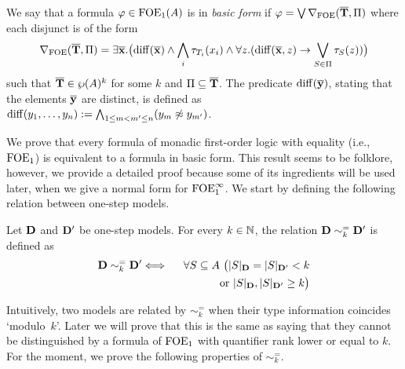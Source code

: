 \begin{definition}%
We say that a formula $\varphi \in \mathrm{FOE}_1(A)$ is in \emph{basic form} if $\varphi = \bigvee \nabla_{\mathrm{FOE}}(\overline{{\mathbf{T}}},\Pi)$ where each disjunct is of the form
%
\[
\nabla_{\mathrm{FOE}}(\overline{{\mathbf{T}}},\Pi) = \exists \overline{{\mathbf{x}}}.\big(\mathrm{diff}(\overline{{\mathbf{x}}}) \land \bigwedge_i \tau_{T_i}(x_i) \land \forall z.(\mathrm{diff}(\overline{{\mathbf{x}}},z) \to \bigvee_{S\in \Pi} \tau_S(z))\big)
\]
%
such that $\overline{{\mathbf{T}}} \in \wp(A)^k$ for some $k$ and $\Pi \subseteq \overline{{\mathbf{T}}}$.  The predicate $\mathrm{diff}(\overline{{\mathbf{y}}})$, stating that the elements $\overline{{\mathbf{y}}}$ are distinct, is defined as $\mathrm{diff}(y_1,\dots,y_n) := \bigwedge_{1\leq m < m^{\prime} \leq n} (y_m \not\approx y_{m^{\prime}})$.
\end{definition}

We prove that every formula of monadic first-order logic with equality (i.e., $\mathrm{FOE}_1$) is equivalent to a formula in basic form. This result seems to be folklore, however, we provide a detailed proof because some of its ingredients will be used later, when we give a normal form for $\mathrm{FOE}^{\infty}_1$. We start by defining the following relation between one-step models.

\begin{definition}
	Let $\mathbf{D}$ and $\mathbf{D}'$ be one-step models. For every $k \in \mathbb{N}$, the relation $\mathbf{D} \sim^=_k \mathbf{D}'$ is defined as
\begin{eqnarray*}
	\osmodel \sim^=_k \osmodel' & \Longleftrightarrow & \forall S\subseteq A \ \big(
	   |S|_\osmodel = |S|_{\osmodel'} < k \\
	&& \qquad\qquad \text{or } |S|_\osmodel,|S|_{\osmodel'} \geq k \big)
\end{eqnarray*}
\end{definition}

Intuitively, two models are related by $\sim^=_k$ when their type information coincides `modulo~$k$'. Later we will prove that this is the same as saying that they cannot be distinguished by a formula of $\mathrm{FOE}_1$ with quantifier rank lower or equal to $k$. For the moment, we prove the following properties of $\sim^=_k$.

